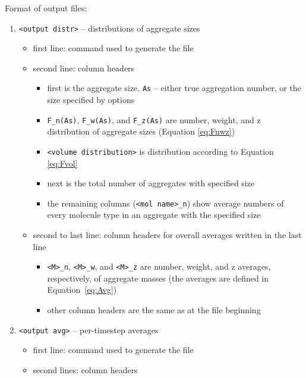 \noindent
Format of output files:
\begin{enumerate}[nosep,leftmargin=20pt]
  \item \texttt{<output distr>} -- distributions of aggregate sizes
    \begin{itemize}[nosep,leftmargin=5pt]
      \item first line: command used to generate the file
      \item second line: column headers
        \begin{itemize}[nosep,leftmargin=10pt]
          \item first is the aggregate size, \texttt{As} -- either true aggregation
            number, or the size specified by options
          \item \texttt{F\_n(As)}, \texttt{F\_w(As)}, and \texttt{F\_z(As)} are
            number, weight, and z distribution of aggregate sizes (Equation
            \eqref{eq:Fnwz})
          \item \texttt{<volume distribution>} is distribution according
            to Equation \eqref{eq:Fvol}
          \item next is the total number of aggregates with specified size
          \item the remaining columns (\texttt{<mol name>\_n}) show average
            numbers of every molecule type in an aggregate with the
            specified size
        \end{itemize}
      \item second to last line: column headers for overall averages
        written in the last line
        \begin{itemize}[nosep,leftmargin=10pt]
          \item \texttt{<M>\_n}, \texttt{<M>\_w}, and \texttt{<M>\_z} are
            number, weight, and z averages, respectively, of aggregate
            masses (the averages are defined in Equation~\eqref{eq:Avg})
          \item other column headers are the same as at the file beginning
        \end{itemize}
    \end{itemize}
  \item \texttt{<output avg>} -- per-timestep averages
  \begin{itemize}[nosep,leftmargin=5pt]
    \item first line: command used to generate the file
    \item second lines: column headers
      \begin{itemize}[nosep,leftmargin=10pt]

\end{itemize}
\end{itemize}
\end{enumerate}
